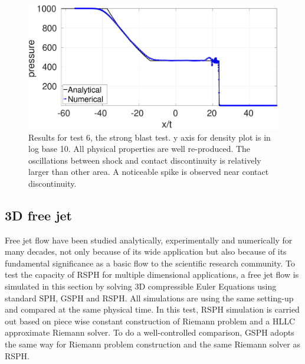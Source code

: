 \begin{figure}[H]
\begin{minipage}{.495 \textwidth}
    \end{minipage}%
    \begin{minipage}{.495 \textwidth}
        \centering
        \includegraphics[width=0.99 \textwidth]{Chapter-4/Figures/strong-blast/StrBlst-RCM-p-Rp3}
    \end{minipage}%
    \caption{Results for test 6, the strong blast test. y axis for density plot is in log base 10. All physical properties are well re-produced. The oscillations between shock and contact discontinuity is relatively larger than other area. A noticeable spike is observed near contact discontinuity.}
    \label{fig:RCM-strong-blast}
\end{figure}

\subsection{3D free jet}
Free jet flow have been studied analytically, experimentally and numerically for many decades, not only because of its wide application but also because of its fundamental significance as a basic flow to the scientific research community. To test the capacity of RSPH for multiple dimensional applications, a free jet flow is simulated in this section by solving 3D compressible Euler Equations using standard SPH, GSPH and RSPH. 
All simulations are using the same setting-up and compared at the same physical time. In this test, RSPH simulation is carried out based on piece wise constant construction of Riemann problem and a HLLC approximate Riemann solver. To do a well-controlled comparison, GSPH adopts the same way for Riemann problem construction and the same Riemann solver as RSPH. 

